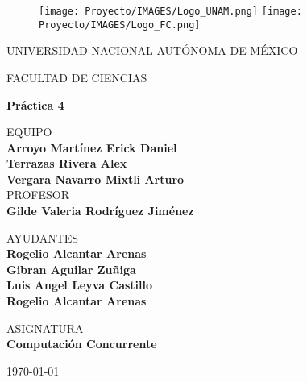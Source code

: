 \documentclass[10pt,letterpaper]{article}
\begin{document}
\thispagestyle{empty}
	
	\begin{figure}[ht]
			\texttt{[image: Proyecto/IMAGES/Logo\_UNAM.png]}
			\label{EscudoUNAM}
	   \endminipage
			\texttt{[image: Proyecto/IMAGES/Logo\_FC.png]}
			\label{EscudoFC}
		\endminipage
	\end{figure}
	
	\begin{center}
	\vspace{0.8cm}
	\LARGE
	UNIVERSIDAD NACIONAL AUTÓNOMA DE MÉXICO 
	
	\vspace{0.8cm}
	\LARGE
	FACULTAD DE CIENCIAS
	
	\vspace{.5cm}	
	\Large
	\textbf{Práctica 4}

	\vspace{.7cm}
	\normalsize	
	EQUIPO \\
	\vspace{.3cm}
	\large
	\textbf{Arroyo Martínez Erick Daniel} \\ 
    \textbf{Terrazas Rivera Alex}\\
    \textbf{Vergara Navarro Mixtli Arturo}
	\vspace{.7cm}\\
	\normalsize	
	PROFESOR \\
	\vspace{.3cm}
	\large
	\textbf{Gilde Valeria Rodríguez Jiménez}

    \vspace{.7cm}
	\normalsize	
	AYUDANTES \\
	\vspace{.3cm}
	\large
	\textbf{Rogelio Alcantar Arenas}\\
    \textbf{Gibran Aguilar Zuñiga}\\
    \textbf{Luis Angel Leyva Castillo}\\
    \textbf{Rogelio Alcantar Arenas}
	
	\vspace{.7cm}
	\normalsize	
	ASIGNATURA \\
	\vspace{.3cm}
	\large
	\textbf{Computación Concurrente}
	
	\vspace{.2cm}
	\today
	\end{center}
	\newpage

\end{document}
